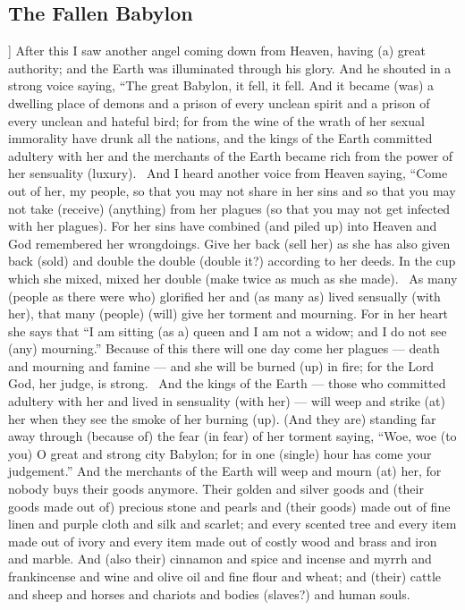 \begin{pages}
\begin{Leftside}
        			\chapter{The Fallen Babylon}
				]		
		After this I saw another angel coming down from Heaven, having (a) great authority; and the Earth was illuminated through his glory. And he shouted in a strong voice saying, “The great Babylon, it fell, it fell. And it became (was) a dwelling place of demons and a prison of every unclean spirit and a prison of every unclean and hateful bird; for from the wine of the wrath of her sexual immorality have drunk all the nations, and the kings of the Earth committed adultery with her and the merchants of the Earth became rich from the power of her sensuality (luxury). 
		\pend
		\pstart
		And I heard another voice from Heaven saying, “Come out of her, my people, so that you may not share in her sins and so that you may not take (receive) (anything) from her plagues (so that you may not get infected with her plagues). For her sins have combined (and piled up) into Heaven and God remembered her wrongdoings. Give her back (sell her) as she has also given back (sold) and double the double (double it?) according to her deeds. In the cup which she mixed, mixed her double (make twice as much as she made). 
		\pend
		\pstart
		As many (people as there were who) glorified her and (as many as) lived sensually (with her), that many (people) (will) give her torment and mourning. For in her heart she says that “I am sitting (as a) queen and I am not a widow; and I do not see (any) mourning.” Because of this there will one day come her plagues — death and mourning and famine — and she will be burned (up) in fire; for the Lord God, her judge, is strong. 
		\pend
		\pstart
		And the kings of the Earth — those who committed adultery with her and lived in sensuality (with her) — will weep and strike (at) her when they see the smoke of her burning (up). (And they are) standing far away through (because of) the fear (in fear) of her torment saying, “Woe, woe (to you) O great and strong city Babylon; for in one (single) hour has come your judgement.”
		\pend
		\pstart
		And the merchants of the Earth will weep and mourn (at) her, for nobody buys their goods anymore. Their golden and silver goods and (their goods made out of) precious stone and pearls and (their goods) made out of fine linen and purple cloth and silk and scarlet; and every scented tree and every item made out of ivory and every item made out of costly wood and brass and iron and marble. And (also their) cinnamon and spice and incense and myrrh and frankincense and wine and olive oil and fine flour and wheat; and (their) cattle and sheep and horses and chariots and bodies (slaves?) and human souls. 

\end{Leftside}
\end{pages}
